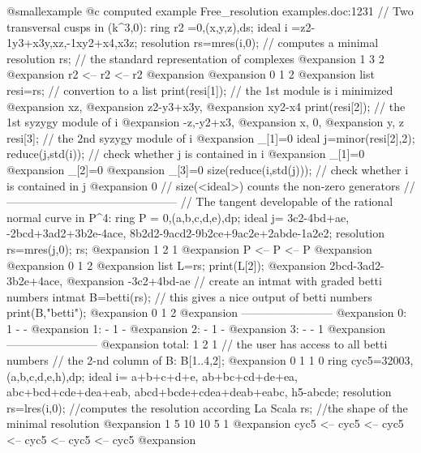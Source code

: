 @smallexample
@c computed example Free_resolution examples.doc:1231 
  // Two transversal cusps in (k^3,0):
  ring r2 =0,(x,y,z),ds;
  ideal i =z2-1y3+x3y,xz,-1xy2+x4,x3z;
  resolution rs=mres(i,0);   // computes a minimal resolution
  rs;                        // the standard representation of complexes
@expansion{}   1       3       2       
@expansion{} r2 <--  r2 <--  r2
@expansion{} 
@expansion{} 0       1       2       
@expansion{} 
    list resi=rs;            // convertion to a list
  print(resi[1]);            // the 1st module is i minimized
@expansion{} xz,
@expansion{} z2-y3+x3y,
@expansion{} xy2-x4
  print(resi[2]);            // the 1st syzygy module of i
@expansion{} -z,-y2+x3,
@expansion{} x, 0,     
@expansion{} y, z      
  resi[3];                   // the 2nd syzygy module of i
@expansion{} _[1]=0
  ideal j=minor(resi[2],2);
  reduce(j,std(i));          // check whether j is contained in i
@expansion{} _[1]=0
@expansion{} _[2]=0
@expansion{} _[3]=0
  size(reduce(i,std(j)));    // check whether i is contained in j
@expansion{} 0
  // size(<ideal>) counts the non-zero generators
  // ---------------------------------------------
  // The tangent developable of the rational normal curve in P^4:
  ring P = 0,(a,b,c,d,e),dp;
  ideal j= 3c2-4bd+ae, -2bcd+3ad2+3b2e-4ace,
           8b2d2-9acd2-9b2ce+9ac2e+2abde-1a2e2;
  resolution rs=mres(j,0);
  rs;
@expansion{}  1      2      1      
@expansion{} P <--  P <--  P
@expansion{} 
@expansion{} 0      1      2      
@expansion{} 
  list L=rs;
  print(L[2]);
@expansion{} 2bcd-3ad2-3b2e+4ace,
@expansion{} -3c2+4bd-ae         
  // create an intmat with graded betti numbers
  intmat B=betti(rs);
  // this gives a nice output of betti numbers
  print(B,"betti");
@expansion{}            0     1     2
@expansion{} ------------------------
@expansion{}     0:     1     -     -
@expansion{}     1:     -     1     -
@expansion{}     2:     -     1     -
@expansion{}     3:     -     -     1
@expansion{} ------------------------
@expansion{} total:     1     2     1
  // the user has access to all betti numbers
  // the 2-nd column of B:
  B[1..4,2];
@expansion{} 0 1 1 0
  ring cyc5=32003,(a,b,c,d,e,h),dp;
  ideal i=
  a+b+c+d+e,
  ab+bc+cd+de+ea,
  abc+bcd+cde+dea+eab,
  abcd+bcde+cdea+deab+eabc,
  h5-abcde;
  resolution rs=lres(i,0);   //computes the resolution according La Scala
  rs;                        //the shape of the minimal resolution
@expansion{}     1         5         10         10         5         1         
@expansion{} cyc5 <--  cyc5 <--  cyc5 <--   cyc5 <--   cyc5 <--  cyc5
@expansion{} 
